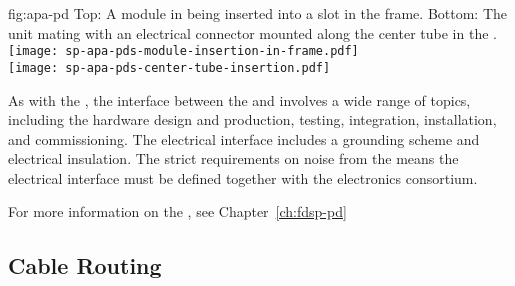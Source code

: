 \begin{dunefigure}{fig:apa-pd}
{Top: A  module in  being inserted into a slot in the frame. Bottom: The  unit mating with an electrical connector mounted along the center tube in the .
}
\texttt{[image: sp-apa-pds-module-insertion-in-frame.pdf]}\\
\vspace{2mm}
\texttt{[image: sp-apa-pds-center-tube-insertion.pdf]}
\end{dunefigure}

As with the , the interface between the  and  involves a wide range of topics, including the hardware design and production, testing, integration, installation, and commissioning. 
The electrical interface includes a grounding scheme and electrical insulation. The strict requirements on noise from the  means the electrical interface must be defined together with the  electronics consortium. 

For more information on the , see Chapter~\ref{ch:fdsp-pd} %



\subsection{Cable Routing}
\label{sec:fdsp-apa-intfc-cables}

